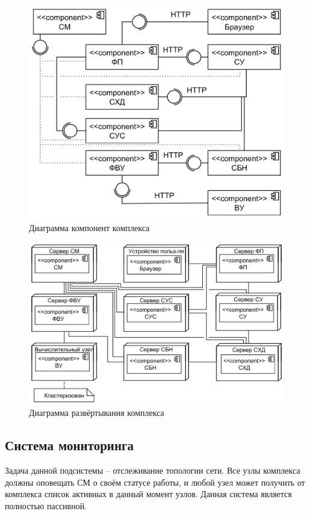 \documentclass[a4paper,12pt]{report}
\numberwithin{equation}{section}
\begin{document}
\begin{figure}[b]
  \centering
  \includegraphics[width=.7\linewidth]{diagrams/common/component}
  \caption{Диаграмма компонент комплекса}
  \label{fig:comp-common}
\end{figure}

\begin{figure}
  \centering
  \includegraphics[width=\linewidth]{diagrams/common/deployment}
  \caption{Диаграмма развёртывания комплекса}
  \label{fig:depl-common}
\end{figure}

\subsection{Система мониторинга}
Задача данной подсистемы -- отслеживание топологии сети.
Все узлы комплекса должны оповещать СМ о своём статусе работы, 
и любой узел может получить от комплекса список активных в данный момент узлов.
Данная система является полностью пассивной.
\end{document}
